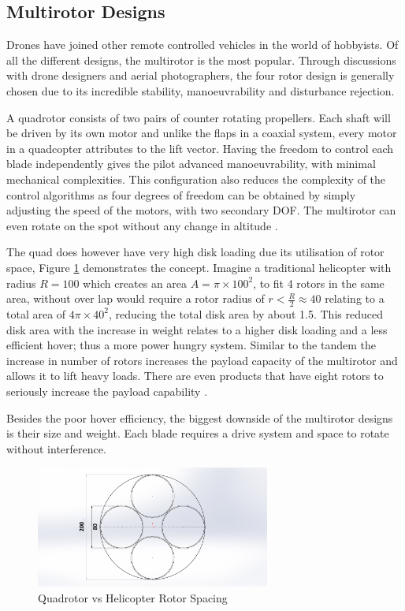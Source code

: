 \documentclass[a4paper, 10pt, conference]{ieeeconf}
\begin{document}
\subsection{Multirotor Designs}
Drones have joined other remote controlled vehicles in the world of hobbyists. Of all the different designs, the multirotor is the most popular. Through discussions with drone designers and aerial photographers, the four rotor design is generally chosen due to its incredible stability, manoeuvrability and disturbance rejection.

A quadrotor consists of two pairs of counter rotating propellers. Each shaft will be driven by its own motor and unlike the flaps in a coaxial system, every motor in a quadcopter attributes to the lift vector. Having the freedom to control each blade independently gives the pilot advanced manoeuvrability, with minimal mechanical complexities. This configuration also reduces the complexity of the control algorithms as four degrees of freedom can be obtained by simply adjusting the speed of the motors, with two secondary DOF. The multirotor can even rotate on the spot without any change in altitude \cite{ThrustCritical}. 

The quad does however have very high disk loading due its utilisation of rotor space, Figure \ref{IM_CounterBlades} demonstrates the concept. Imagine a traditional helicopter with radius $R = 100$ which creates an area $A = \pi \times 100^2 $, to fit 4 rotors in the same area, without over lap would require a rotor radius of $r < \frac{R}{2} \approx 40$ relating to a total area of $4  \pi \times 40^2$, reducing the total disk area by about 1.5. This reduced disk area with the increase in weight relates to a higher disk loading and a less efficient hover; thus a more power hungry system. Similar to the tandem the increase in number of rotors increases the payload capacity of the multirotor and allows it to lift heavy loads. There are even products that have eight rotors to seriously increase the payload capability \cite{Octocopter}.

Besides the poor hover efficiency, the biggest downside of the multirotor designs is their size and weight. Each blade requires a drive system and space to rotate without interference.

\begin{figure}[t]
\centering
\includegraphics[height =4cm]{Images/Literature/Quad}
\caption{Quadrotor vs Helicopter Rotor Spacing}
\label{IM_CounterBlades}
\end{figure}
\end{document}

